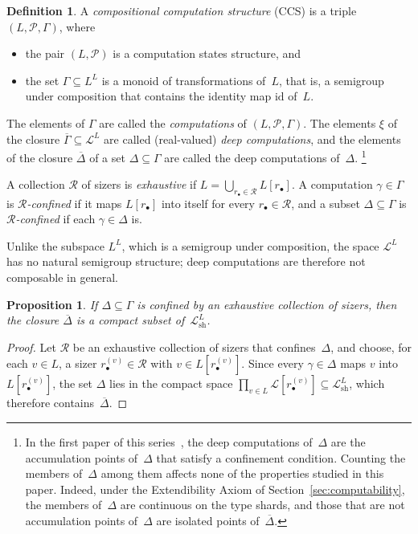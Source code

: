 \documentclass[psamsfonts]{amsart}
\newtheorem{prop}[thm]{Proposition}
\theoremstyle{definition}
\newtheorem{defn}[thm]{Definition}
\theoremstyle{remark}
\newcommand{\Lshard}{\mathcal{L}_{\mathrm{sh}}}
\newcommand{\rb}{r_{\bullet}}
\numberwithin{equation}{section}
\begin{document}
\begin{defn}
  \label{def:CCS}
  A \emph{compositional computation structure} (CCS) is a triple $(L,\mathcal{P},\Gamma)$, where
  \begin{itemize}
  \item
    the pair $(L,\mathcal{P})$ is a computation states structure, and
  \item
    the set $\Gamma\subseteq L^L$ is a monoid of transformations of~$L$, that is, a semigroup under composition that contains the identity map $\text{id}$ of~$L$.
  \end{itemize}
  The elements of $\Gamma$ are called the \emph{computations} of $(L,\mathcal{P},\Gamma)$.
  The elements $\xi$ of the closure $\overline{\Gamma}\subseteq\mathcal{L}^L$ are called (real-valued) \emph{deep computations}, and the elements of the closure $\overline{\Delta}$ of a set $\Delta\subseteq\Gamma$ are called the deep computations of~$\Delta$.%
  \footnote{In the first paper of this series~\cite{alva2024approximability}, the deep computations of~$\Delta$ are the accumulation points of~$\Delta$ that satisfy a confinement condition.
    Counting the members of~$\Delta$ among them affects none of the properties studied in this paper.
    Indeed, under the Extendibility Axiom of Section~\ref{sec:computability}, the members of~$\Delta$ are continuous on the type shards, and those that are not accumulation points of~$\Delta$ are isolated points of~$\overline{\Delta}$.}

  A collection $\mathscr{R}$ of sizers is \emph{exhaustive} if $L = \bigcup_{\rb\in \mathscr{R}}L[\rb]$.
  A computation $\gamma\in\Gamma$ is \emph{$\mathscr{R}$-confined} if it maps $L[r_\bullet]$ into itself for every $r_\bullet\in \mathscr{R}$, and a subset $\Delta\subseteq\Gamma$ is \emph{$\mathscr{R}$-confined} if each $\gamma\in \Delta$ is.
\end{defn}

Unlike the subspace $L^L$, which is a semigroup under composition, the space $\mathcal{L}^L$ has no natural semigroup structure;
deep computations are therefore not composable in general.

\begin{prop}\label{prop:confined-compact}
  If $\Delta\subseteq\Gamma$ is confined by an exhaustive collection of sizers, then the closure $\overline{\Delta}$ is a compact subset of~$\Lshard^L$.
\end{prop}
\begin{proof}
  Let $\mathscr{R}$ be an exhaustive collection of sizers that confines~$\Delta$, and choose, for each $v\in L$, a sizer $\rb^{(v)}\in \mathscr{R}$ with $v\in L[\rb^{(v)}]$.
  Since every $\gamma\in\Delta$ maps $v$ into $L[\rb^{(v)}]$, the set $\Delta$ lies in the compact space $\prod_{v\in L}\mathcal{L}[\rb^{(v)}]\subseteq\Lshard^L$, which therefore contains~$\overline{\Delta}$.
\end{proof}
\end{document}
